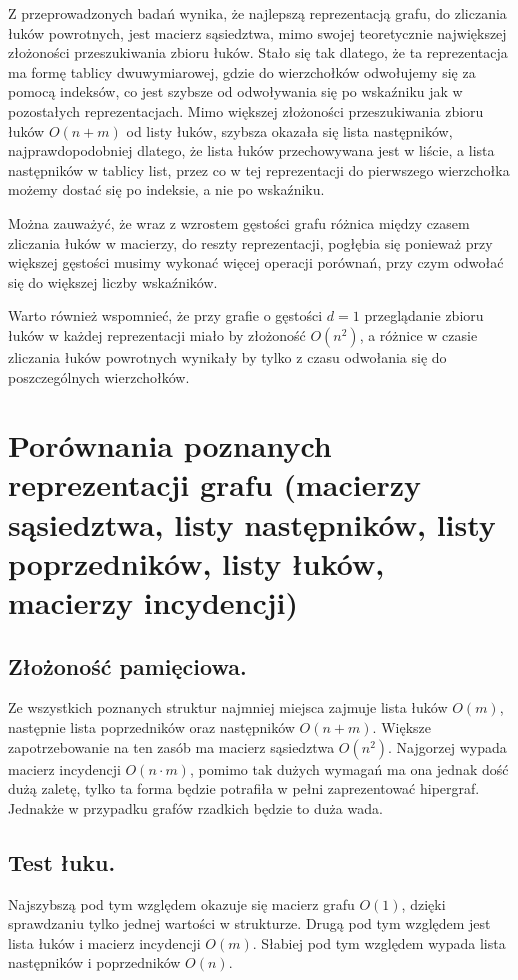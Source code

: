 \documentclass[polish,polish,a4paper]{article}
\begin{document}
\begin{spacing}{1.25}
Z przeprowadzonych badań wynika, że najlepszą reprezentacją grafu, do zliczania łuków powrotnych, jest macierz sąsiedztwa, mimo swojej teoretycznie największej złożoności przeszukiwania zbioru łuków. Stało się tak dlatego, że ta reprezentacja ma formę tablicy dwuwymiarowej, gdzie do wierzchołków odwołujemy się za pomocą indeksów, co jest szybsze od odwoływania się po wskaźniku jak w pozostałych reprezentacjach.
Mimo większej złożoności przeszukiwania zbioru łuków  $O(n+m)$  od listy łuków, szybsza okazała się lista następników, najprawdopodobniej dlatego, że lista łuków przechowywana jest w liście, a lista następników w tablicy list, przez co w tej reprezentacji do pierwszego wierzchołka możemy dostać się po indeksie, a nie po wskaźniku.

Można zauważyć, że wraz z wzrostem gęstości grafu różnica między czasem zliczania łuków w macierzy, do reszty reprezentacji, pogłębia się ponieważ przy większej gęstości musimy wykonać więcej operacji porównań, przy czym odwołać się do większej liczby wskaźników.

Warto również wspomnieć, że przy grafie o gęstości $d=1$ przeglądanie zbioru łuków w każdej reprezentacji miało by złożoność $O(n^2)$, a różnice w czasie zliczania łuków powrotnych wynikały by tylko z czasu odwołania się do poszczególnych wierzchołków.


\section{Porównania poznanych reprezentacji grafu (macierzy sąsiedztwa, listy następników, listy poprzedników, listy łuków, macierzy incydencji)}



\subsection{Złożoność pamięciowa.}
Ze wszystkich poznanych struktur najmniej miejsca zajmuje lista łuków $ O(m) $, następnie lista poprzedników oraz następników $ O(n+m) $. Większe zapotrzebowanie na ten zasób ma macierz sąsiedztwa $ O(n^2) $. Najgorzej wypada macierz incydencji $ O(n \cdot m) $, pomimo tak dużych wymagań ma ona jednak dość dużą zaletę, tylko ta forma będzie potrafiła w pełni zaprezentować hipergraf. Jednakże w przypadku grafów rzadkich będzie to duża wada.

\subsection{Test łuku.}
Najszybszą pod tym względem okazuje się macierz grafu $ O(1) $, dzięki sprawdzaniu tylko jednej wartości w strukturze. Drugą pod tym względem jest lista łuków i macierz incydencji $ O(m) $. Słabiej pod tym względem wypada lista następników i poprzedników $ O(n) $. 


\end{spacing}
\end{document}
